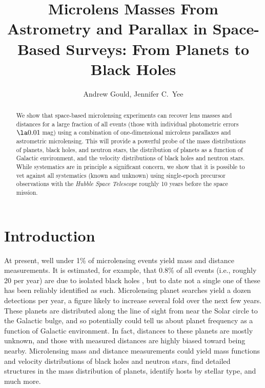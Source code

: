 \documentclass[12pt,preprint]{aastex}
\begin{document}
\title{Microlens Masses From Astrometry and Parallax in Space-Based Surveys:
 From Planets to Black Holes}
\author{
Andrew Gould,
Jennifer C.\ Yee
}

\begin{abstract} 
We show that space-based microlensing experiments can recover
lens masses and distances for a large fraction of all events
(those with individual photometric errors $\la 0.01\,$mag)
using a combination of one-dimensional microlens parallaxes
and astrometric microlensing.  This will provide a powerful
probe of the mass distributions of planets, black holes,
and neutron stars, the distribution of planets as a function
of Galactic environment, and the velocity distributions of
black holes and neutron stars.  While systematics are in principle a 
significant concern, we show that it is possible to vet
against all systematics (known and unknown) using single-epoch
precursor observations with the {\it Hubble Space Telescope}
roughly 10 years before the space mission.

\end{abstract}




\section{{Introduction}
\label{sec:intro}}

At present, well under 1\% of microlensing events yield mass and distance
measurements.  It is estimated, for example, that 0.8\% of all events
(i.e., roughly 20 per year) are due to isolated black holes \citep{gould00},
but to date not a single one of these has been reliably identified as such.
Microlensing planet searches yield a dozen detections per year, a figure
likely to increase several fold over the next few years.  These planets
are distributed along the line of sight from near the Solar circle to
the Galactic bulge, and so potentially could tell us about planet
frequency as a function of Galactic environment.  In fact, distances
to these planets are mostly unknown, and those with measured distances
are highly biased toward being nearby.  Microlensing mass and distance
measurements could yield mass functions and velocity distributions
of black holes and neutron stars,
find detailed structures in the mass distribution of planets, identify
hosts by stellar type, and much more.
\end{document}
